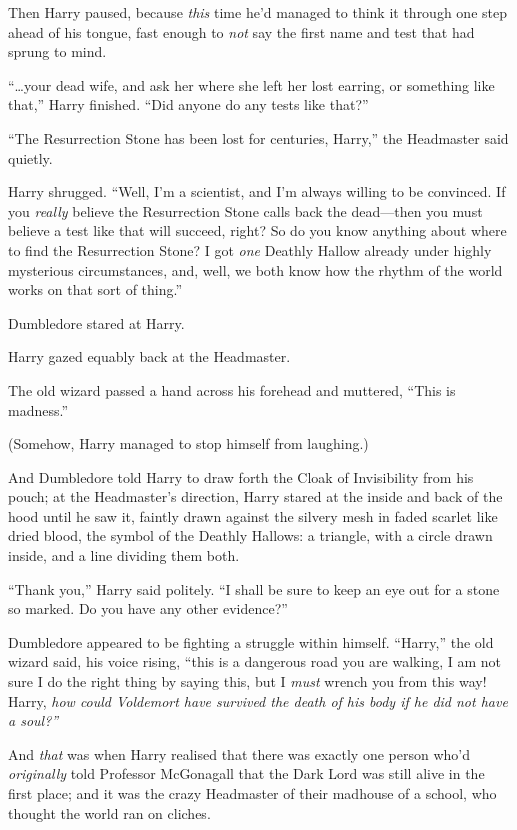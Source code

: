 Then Harry paused, because \emph{this} time he'd managed to think it
through one step ahead of his tongue, fast enough to \emph{not} say the
first name and test that had sprung to mind.

``\ldots{}your dead wife, and ask her where she left her lost earring,
or something like that,'' Harry finished. ``Did anyone do any tests like
that?''

``The Resurrection Stone has been lost for centuries, Harry,'' the
Headmaster said quietly.

Harry shrugged. ``Well, I'm a scientist, and I'm always willing to be
convinced. If you \emph{really} believe the Resurrection Stone calls
back the dead---then you must believe a test like that will succeed,
right? So do you know anything about where to find the Resurrection
Stone? I got \emph{one} Deathly Hallow already under highly mysterious
circumstances, and, well, we both know how the rhythm of the world works
on that sort of thing.''

Dumbledore stared at Harry.

Harry gazed equably back at the Headmaster.

The old wizard passed a hand across his forehead and muttered, ``This is
madness.''

(Somehow, Harry managed to stop himself from laughing.)

And Dumbledore told Harry to draw forth the Cloak of Invisibility from
his pouch; at the Headmaster's direction, Harry stared at the inside and
back of the hood until he saw it, faintly drawn against the silvery mesh
in faded scarlet like dried blood, the symbol of the Deathly Hallows: a
triangle, with a circle drawn inside, and a line dividing them both.

``Thank you,'' Harry said politely. ``I shall be sure to keep an eye out
for a stone so marked. Do you have any other evidence?''

Dumbledore appeared to be fighting a struggle within himself. ``Harry,''
the old wizard said, his voice rising, ``this is a dangerous road you
are walking, I am not sure I do the right thing by saying this, but I
\emph{must} wrench you from this way! Harry, \emph{how could Voldemort
have survived the death of his body if he did not have a soul?''}

And \emph{that} was when Harry realised that there was exactly one
person who'd \emph{originally} told Professor McGonagall that the Dark
Lord was still alive in the first place; and it was the crazy Headmaster
of their madhouse of a school, who thought the world ran on cliches.

